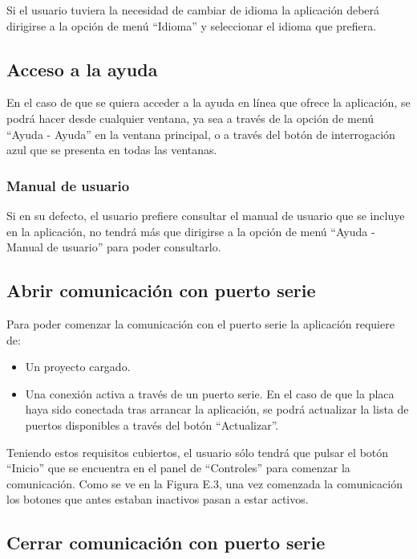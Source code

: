 Si el usuario tuviera la necesidad de cambiar de idioma la aplicación deberá dirigirse a la opción de menú ``Idioma'' y seleccionar el idioma que prefiera.

\subsection{Acceso a la ayuda}

En el caso de que se quiera acceder a la ayuda en línea que ofrece la aplicación, se podrá hacer desde cualquier ventana, ya sea a través de la opción de menú ``Ayuda - Ayuda'' en la ventana principal, o a través del botón de interrogación azul que se presenta en todas las ventanas.

\subsubsection{Manual de usuario}

Si en su defecto, el usuario prefiere consultar el manual de usuario que se incluye en la aplicación, no tendrá más que dirigirse a la opción de menú ``Ayuda - Manual de usuario'' para poder consultarlo.

\subsection{Abrir comunicación con puerto serie}

Para poder comenzar la comunicación con el puerto serie la aplicación requiere de:
\begin{itemize}
	\item Un proyecto cargado.
	\item Una conexión activa a través de un puerto serie. En el caso de que la placa haya sido conectada tras arrancar la aplicación, se podrá actualizar la lista de puertos disponibles a través del botón ``Actualizar''.
\end{itemize}

Teniendo estos requisitos cubiertos, el usuario sólo tendrá que pulsar el botón ``Inicio'' que se encuentra en el panel de ``Controles'' para comenzar la comunicación. Como se ve en la Figura E.3, una vez comenzada la comunicación los botones que antes estaban inactivos pasan a estar activos.


\subsection{Cerrar comunicación con puerto serie}

